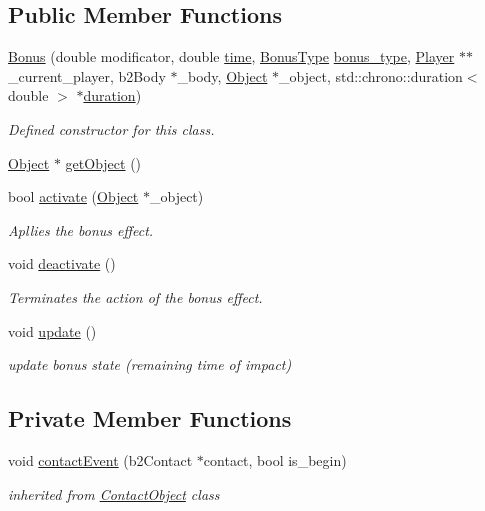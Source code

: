 \subsection*{Public Member Functions}
\begin{DoxyCompactItemize}
\item 
\hyperlink{class_bonus_ac8581e33c82c8d6515b78ccffcf6f11b}{Bonus} (double modificator, double \hyperlink{class_bonus_a7af3e40f87206d34e4689f53e37733b3}{time}, \hyperlink{_bonus_8h_ad6d58ebabfbf9aa4181bfe97a5d8d984}{Bonus\+Type} \hyperlink{class_bonus_a3e8678940c7ea4679428e78874d92117}{bonus\+\_\+type}, \hyperlink{class_player}{Player} $\ast$$\ast$\+\_\+current\+\_\+player, b2\+Body $\ast$\+\_\+body, \hyperlink{class_object}{Object} $\ast$\+\_\+object, std\+::chrono\+::duration$<$ double $>$ $\ast$\hyperlink{class_bonus_a98befe64efce3a1c5c93f2d694ea1abc}{duration})
\begin{DoxyCompactList}\small\item\em Defined constructor for this class. \end{DoxyCompactList}\item 
\hyperlink{class_object}{Object} $\ast$ \hyperlink{class_bonus_a5964466dfbb4b4e3e7d3eafcb9dae7db}{get\+Object} ()
\item 
bool \hyperlink{class_bonus_a78f64b402daa7593afb28b78baf6d15e}{activate} (\hyperlink{class_object}{Object} $\ast$\+\_\+object)
\begin{DoxyCompactList}\small\item\em Apllies the bonus effect. \end{DoxyCompactList}\item 
void \hyperlink{class_bonus_a52875b799a9937f5c398f8f95d9ead98}{deactivate} ()
\begin{DoxyCompactList}\small\item\em Terminates the action of the bonus effect. \end{DoxyCompactList}\item 
\mbox{\label{class_bonus_a40703fa50a436a844f0638557a175be0}} 
void \hyperlink{class_bonus_a40703fa50a436a844f0638557a175be0}{update} ()
\begin{DoxyCompactList}\small\item\em update bonus state (remaining time of impact) \end{DoxyCompactList}\end{DoxyCompactItemize}
\subsection*{Private Member Functions}
\begin{DoxyCompactItemize}
\item 
\mbox{\label{class_bonus_abc52e8c896f8ec6631ac5dcd7e4daf12}} 
void \hyperlink{class_bonus_abc52e8c896f8ec6631ac5dcd7e4daf12}{contact\+Event} (b2\+Contact $\ast$contact, bool is\+\_\+begin)
\begin{DoxyCompactList}\small\item\em inherited from \hyperlink{class_contact_object}{Contact\+Object} class \end{DoxyCompactList}\end{DoxyCompactItemize}
